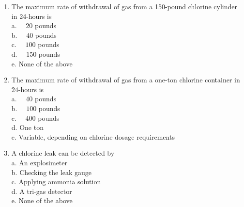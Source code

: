 \begin{enumerate}
\item The maximum rate of withdrawal of gas from a 150-pound chlorine cylinder in 24-hours is\\
a. $\quad 20$ pounds\\
b. $\quad 40$ pounds\\
c. $\quad 100$ pounds\\
d. $\quad 150$ pounds\\
e. None of the above\\
  \item The maximum rate of withdrawal of gas from a one-ton chlorine container in 24-hours is\\
a. $\quad 40$ pounds\\
b. $\quad 100$ pounds\\
c. $\quad 400$ pounds\\
d. One ton\\
e. Variable, depending on chlorine dosage requirements\\
  \item A chlorine leak can be detected by\\
a. An explosimeter\\
b. Checking the leak gauge\\
c. Applying ammonia solution\\
d. A tri-gas detector\\
e. None of the above\\


\end{enumerate}
